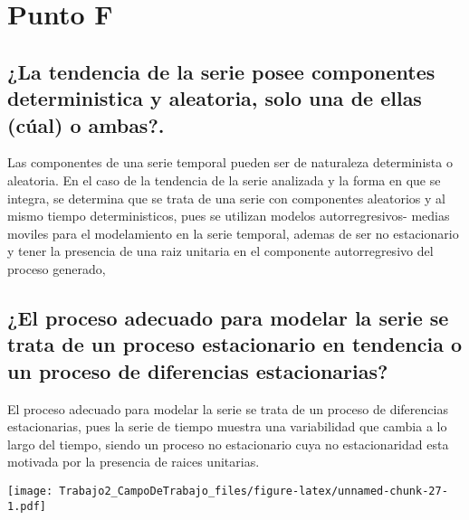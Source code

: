 \documentclass[
]{article}
\newenvironment{Shaded}{\begin{snugshade}}{\end{snugshade}}
\newcommand{\CommentTok}[1]{\textcolor[rgb]{0.56,0.35,0.01}{\textit{#1}}}
\newcommand{\FunctionTok}[1]{\textcolor[rgb]{0.00,0.00,0.00}{#1}}
\newcommand{\NormalTok}[1]{#1}
\newcommand{\OtherTok}[1]{\textcolor[rgb]{0.56,0.35,0.01}{#1}}
\newcommand{\SpecialCharTok}[1]{\textcolor[rgb]{0.00,0.00,0.00}{#1}}
\begin{document}
\hypertarget{punto-f}{%
\section{Punto F}\label{punto-f}}

\hypertarget{la-tendencia-de-la-serie-posee-componentes-deterministica-y-aleatoria-solo-una-de-ellas-cuxfaal-o-ambas.}{%
\subsection{¿La tendencia de la serie posee componentes deterministica y
aleatoria, solo una de ellas (cúal) o
ambas?.}\label{la-tendencia-de-la-serie-posee-componentes-deterministica-y-aleatoria-solo-una-de-ellas-cuxfaal-o-ambas.}}

Las componentes de una serie temporal pueden ser de naturaleza
determinista o aleatoria. En el caso de la tendencia de la serie
analizada y la forma en que se integra, se determina que se trata de una
serie con componentes aleatorios y al mismo tiempo deterministicos, pues
se utilizan modelos autorregresivos- medias moviles para el modelamiento
en la serie temporal, ademas de ser no estacionario y tener la presencia
de una raiz unitaria en el componente autorregresivo del proceso
generado,

\hypertarget{el-proceso-adecuado-para-modelar-la-serie-se-trata-de-un-proceso-estacionario-en-tendencia-o-un-proceso-de-diferencias-estacionarias}{%
\subsection{¿El proceso adecuado para modelar la serie se trata de un
proceso estacionario en tendencia o un proceso de diferencias
estacionarias?}\label{el-proceso-adecuado-para-modelar-la-serie-se-trata-de-un-proceso-estacionario-en-tendencia-o-un-proceso-de-diferencias-estacionarias}}

El proceso adecuado para modelar la serie se trata de un proceso de
diferencias estacionarias, pues la serie de tiempo muestra una
variabilidad que cambia a lo largo del tiempo, siendo un proceso no
estacionario cuya no estacionaridad esta motivada por la presencia de
raices unitarias.

\begin{Shaded}
\end{Shaded}

\texttt{[image: Trabajo2\_CampoDeTrabajo\_files/figure-latex/unnamed-chunk-27-1.pdf]}
\end{document}
